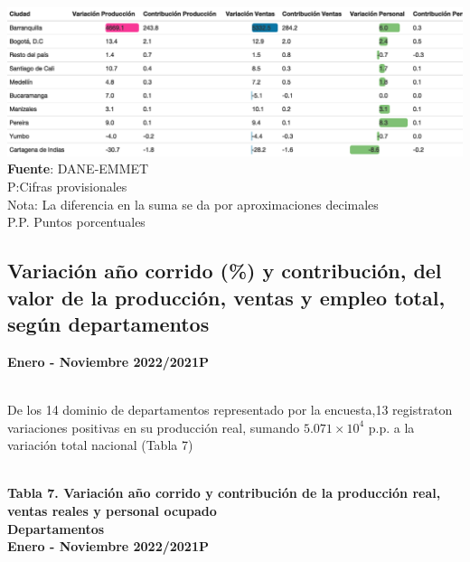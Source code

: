 \documentclass[
]{article}
\begin{document}
\includegraphics{boletin_files/figure-latex/tabla6_view-1.png}
\textbf{Fuente}: DANE-EMMET\\
P:Cifras provisionales\\
Nota: La diferencia en la suma se da por aproximaciones decimales\\
P.P. Puntos porcentuales\\

\hypertarget{variaciuxf3n-auxf1o-corrido-y-contribuciuxf3n-del-valor-de-la-producciuxf3n-ventas-y-empleo-total-seguxfan-departamentos}{%
\subsection{Variación año corrido (\%) y contribución, del valor de la
producción, ventas y empleo total, según
departamentos}\label{variaciuxf3n-auxf1o-corrido-y-contribuciuxf3n-del-valor-de-la-producciuxf3n-ventas-y-empleo-total-seguxfan-departamentos}}

\textbf{Enero - Noviembre 2022/2021P}\\
\strut \\

De los 14 dominio de departamentos representado por la encuesta,13
registraton variaciones positivas en su producción real, sumando
\ensuremath{5.071\times 10^{4}} p.p. a la variación total nacional
(Tabla 7)\\
\strut \\
\textbf{Tabla 7. Variación año corrido y contribución de la producción
real, ventas reales y personal ocupado}\\
\textbf{Departamentos}\\
\textbf{Enero - Noviembre 2022/2021P}\\
\end{document}
